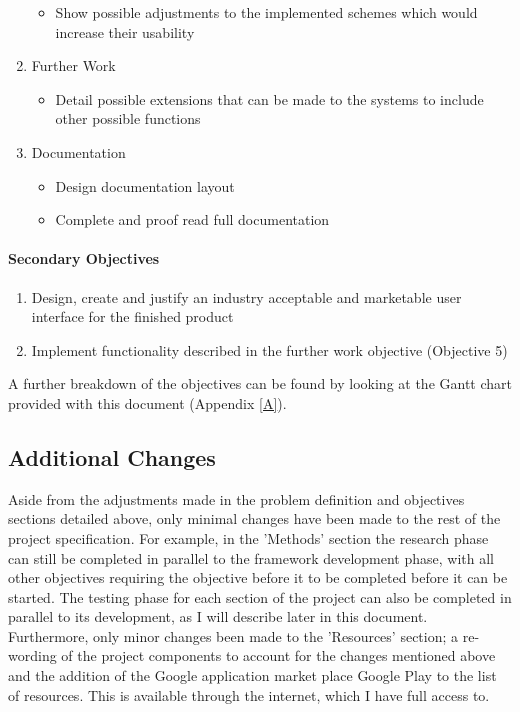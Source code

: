 \documentclass[a4paper,11pt]{article}
\begin{document}
\begin{enumerate}
\begin{itemize}
    \item Show possible adjustments to the implemented schemes which would increase their usability
  \end{itemize}
  \item Further Work
  \begin{itemize}
    \item Detail possible extensions that can be made to the systems to include other possible functions
  \end{itemize}
  \item Documentation
  \begin{itemize}
    \item Design documentation layout
    \item Complete and proof read full documentation
  \end{itemize}
\end{enumerate}

\paragraph{Secondary Objectives}
\begin{enumerate}
  \item Design, create and justify an industry acceptable and marketable user interface for the finished product
  \item Implement functionality described in the further work objective (Objective 5)
\end{enumerate}

\vspace{3pt}
A further breakdown of the objectives can be found by looking at the Gantt chart provided with this document (Appendix \ref{A}).

\subsection{Additional Changes}

Aside from the adjustments made in the problem definition and objectives sections detailed above, only minimal changes have been made to the rest of the project specification. For example, in the 'Methods' section the research phase can still be completed in parallel to the framework development phase, with all other objectives requiring the objective before it to be completed before it can be started. The testing phase for each section of the project can also be completed in parallel to its development, as I will describe later in this document. Furthermore, only minor changes been made to the 'Resources' section; a re-wording of the project components to account for the changes mentioned above and the addition of the Google application market place Google Play\cite{googleplay} to the list of resources. This is available through the internet, which I have full access to.
\end{document}
